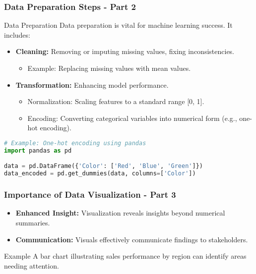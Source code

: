 \documentclass[aspectratio=169]{beamer}
\begin{document}
\begin{frame}[fragile]
    \frametitle{Data Preparation Steps - Part 2}
    \begin{block}{Data Preparation}
        Data preparation is vital for machine learning success. It includes:
    \end{block}
    \begin{itemize}
        \item \textbf{Cleaning:} Removing or imputing missing values, fixing inconsistencies.
        \begin{itemize}
            \item Example: Replacing missing values with mean values.
        \end{itemize}
        \item \textbf{Transformation:} Enhancing model performance.
        \begin{itemize}
            \item Normalization: Scaling features to a standard range [0, 1].
            \item Encoding: Converting categorical variables into numerical form (e.g., one-hot encoding).
        \end{itemize}
    \end{itemize}
    \begin{lstlisting}[language=Python]
# Example: One-hot encoding using pandas
import pandas as pd

data = pd.DataFrame({'Color': ['Red', 'Blue', 'Green']})
data_encoded = pd.get_dummies(data, columns=['Color'])
    \end{lstlisting}
\end{frame}

\begin{frame}[fragile]
    \frametitle{Importance of Data Visualization - Part 3}
    \begin{itemize}
        \item \textbf{Enhanced Insight:} Visualization reveals insights beyond numerical summaries.
        \item \textbf{Communication:} Visuals effectively communicate findings to stakeholders.
    \end{itemize}
    \begin{block}{Example}
        A bar chart illustrating sales performance by region can identify areas needing attention.
    \end{block}
\end{frame}
\end{document}
